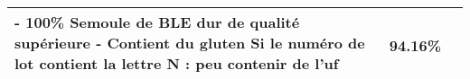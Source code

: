 \begin{longtable}{p{13cm}p{13cm}c}
                                                                                                                                                                                                                                                                                                                                                                                                                                                                                                                                                                                                                                                                                                                                                                                                                                                                                                                                                - 100\% Semoule de BLE dur de qualité supérieure \newline - Contient du gluten \newline Si le numéro de lot contient la lettre N : peu contenir de l'uf &   94.16\% \\ \hline

\end{longtable}
